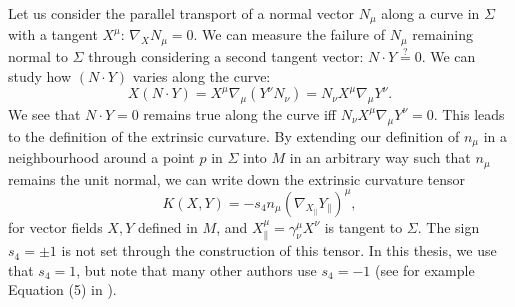 Let us consider the parallel transport of a normal vector $N_\mu$ along a curve in $\Sigma$ with a tangent $X^\mu$: $\nabla_X N_\mu = 0$. We can measure the failure of $N_\mu$ remaining normal to $\Sigma$ through considering a second tangent vector: $N \cdot Y \stackrel{?}{=} 0$. We can study how $(N \cdot Y)$ varies along the curve:
\begin{equation*}
	X(N \cdot Y) = X^\mu \nabla_\mu (Y^\nu N_\nu) = N_\nu X^\mu \nabla_\mu Y^\nu.
\end{equation*}
We see that $N \cdot Y = 0$ remains true along the curve iff  $N_\nu X^\mu \nabla_\mu Y^\nu = 0$. This leads to the definition  of the extrinsic curvature. By extending our definition of $n_\mu$ in a neighbourhood around a point $p$ in $\Sigma$ into $M$ in an arbitrary way such that $n_\mu$ remains the unit normal, we can write down the extrinsic curvature tensor
\begin{equation}
\label{eq:excurdef}
	K(X,Y) = -s_4 n_\mu \left(\nabla_{X_\parallel} Y_{\parallel} \right)^\mu,
\end{equation}
for vector fields $X,Y$ defined in $M$, and $X_{\parallel}^\mu = \gamma^\mu_\nu X^\nu$ is tangent to $\Sigma$. The sign $s_4 = \pm 1$ is not set through the construction of this tensor. In this thesis, we use that $s_4 = 1$, but note that many other authors use $s_4 = -1$ (see for example Equation (5) in \cite{York1986}). 

